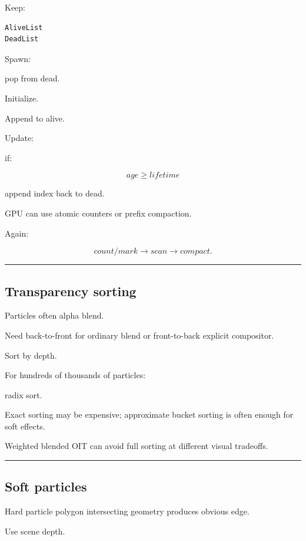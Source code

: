 Keep:

\begin{verbatim}
AliveList
DeadList
\end{verbatim}

Spawn:

pop from dead.

Initialize.

Append to alive.

Update:

if:

\[
age\ge lifetime
\]

append index back to dead.

GPU can use atomic counters or prefix compaction.

Again:

\[
count/mark
\rightarrow
scan
\rightarrow
compact.
\]

\begin{center}\rule{0.5\linewidth}{0.5pt}\end{center}

\subsection{Transparency sorting}\label{04-visual-computing-ii-ch040-transparency-sorting}

Particles often alpha blend.

Need back-to-front for ordinary blend or front-to-back explicit compositor.

Sort by depth.

For hundreds of thousands of particles:

radix sort.

Exact sorting may be expensive; approximate bucket sorting is often enough for soft effects.

Weighted blended OIT can avoid full sorting at different visual tradeoffs.

\begin{center}\rule{0.5\linewidth}{0.5pt}\end{center}

\subsection{Soft particles}\label{04-visual-computing-ii-ch040-soft-particles}

Hard particle polygon intersecting geometry produces obvious edge.

Use scene depth.


